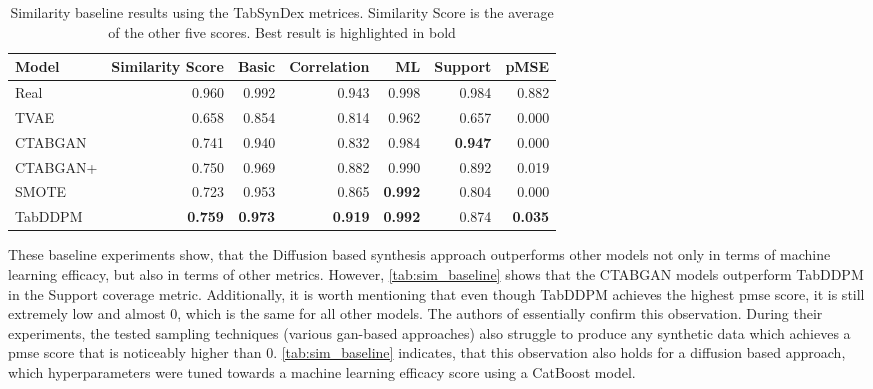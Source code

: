 \begin{table}[h]
	\centering
	\begin{tabular}{lrrrrrr}
		\toprule
		\textbf{Model} & \textbf{Similarity Score} & \textbf{Basic} & \textbf{Correlation} & \textbf{ML}    & \textbf{Support} & \textbf{pMSE}  \\
		\midrule
		Real           & 0.960                     & 0.992          & 0.943                & 0.998          & 0.984            & 0.882          \\
		TVAE           & 0.658                     & 0.854          & 0.814                & 0.962          & 0.657            & 0.000          \\
		CTABGAN        & 0.741                     & 0.940          & 0.832                & 0.984          & \textbf{0.947}   & 0.000          \\
		CTABGAN+       & 0.750                     & 0.969          & 0.882                & 0.990          & 0.892            & 0.019          \\
		SMOTE          & 0.723                     & 0.953          & 0.865                & \textbf{0.992} & 0.804            & 0.000          \\
		TabDDPM        & \textbf{0.759}            & \textbf{0.973} & \textbf{0.919}       & \textbf{0.992} & 0.874            & \textbf{0.035} \\
		\bottomrule
	\end{tabular}
	\caption[Similarity baseline]{Similarity baseline results using the TabSynDex metrices. Similarity Score is the average of the other five scores. Best result is highlighted in bold}
	\label{tab:sim_baseline}
\end{table}

These baseline experiments show, that the Diffusion based synthesis approach outperforms other models not only in terms of machine learning efficacy, but also in terms of other metrics.
However, \autoref{tab:sim_baseline} shows that the CTABGAN models outperform TabDDPM in the Support coverage metric.
Additionally, it is worth mentioning that even though TabDDPM achieves the highest \gls{pmse} score, it is still extremely low and almost 0, which is the same for all other models.
The authors of \cite{chundawat2022UniversalMetricRobust} essentially confirm this observation.
During their experiments, the tested sampling techniques (various \gls{gan}-based approaches) also struggle to produce any synthetic data which achieves a \gls{pmse} score that is noticeably higher than 0.
\autoref{tab:sim_baseline} indicates, that this observation also holds for a diffusion based approach, which hyperparameters were tuned towards a machine learning efficacy score using a CatBoost model.

